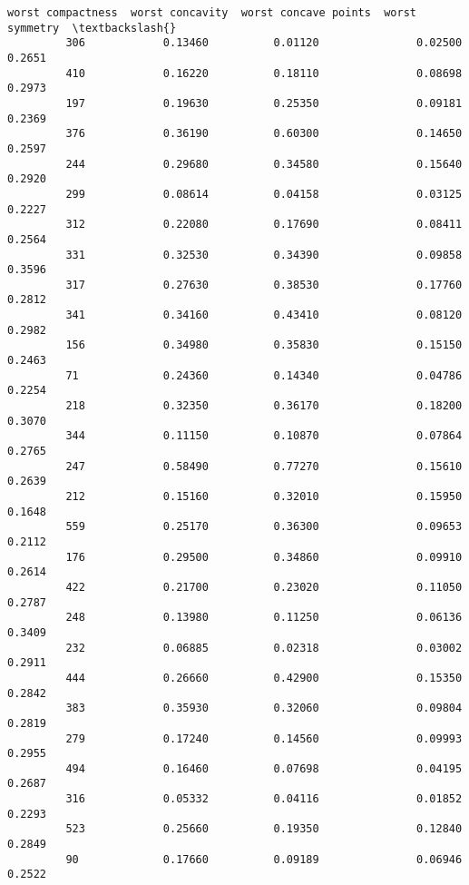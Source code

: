 \documentclass[11pt]{article}
\begin{document}
\begin{Verbatim}[commandchars=\\\{\}]
              worst compactness  worst concavity  worst concave points  worst symmetry  \textbackslash{}
         306            0.13460          0.01120               0.02500          0.2651   
         410            0.16220          0.18110               0.08698          0.2973   
         197            0.19630          0.25350               0.09181          0.2369   
         376            0.36190          0.60300               0.14650          0.2597   
         244            0.29680          0.34580               0.15640          0.2920   
         299            0.08614          0.04158               0.03125          0.2227   
         312            0.22080          0.17690               0.08411          0.2564   
         331            0.32530          0.34390               0.09858          0.3596   
         317            0.27630          0.38530               0.17760          0.2812   
         341            0.34160          0.43410               0.08120          0.2982   
         156            0.34980          0.35830               0.15150          0.2463   
         71             0.24360          0.14340               0.04786          0.2254   
         218            0.32350          0.36170               0.18200          0.3070   
         344            0.11150          0.10870               0.07864          0.2765   
         247            0.58490          0.77270               0.15610          0.2639   
         212            0.15160          0.32010               0.15950          0.1648   
         559            0.25170          0.36300               0.09653          0.2112   
         176            0.29500          0.34860               0.09910          0.2614   
         422            0.21700          0.23020               0.11050          0.2787   
         248            0.13980          0.11250               0.06136          0.3409   
         232            0.06885          0.02318               0.03002          0.2911   
         444            0.26660          0.42900               0.15350          0.2842   
         383            0.35930          0.32060               0.09804          0.2819   
         279            0.17240          0.14560               0.09993          0.2955   
         494            0.16460          0.07698               0.04195          0.2687   
         316            0.05332          0.04116               0.01852          0.2293   
         523            0.25660          0.19350               0.12840          0.2849   
         90             0.17660          0.09189               0.06946          0.2522   

\end{Verbatim}
\end{document}
